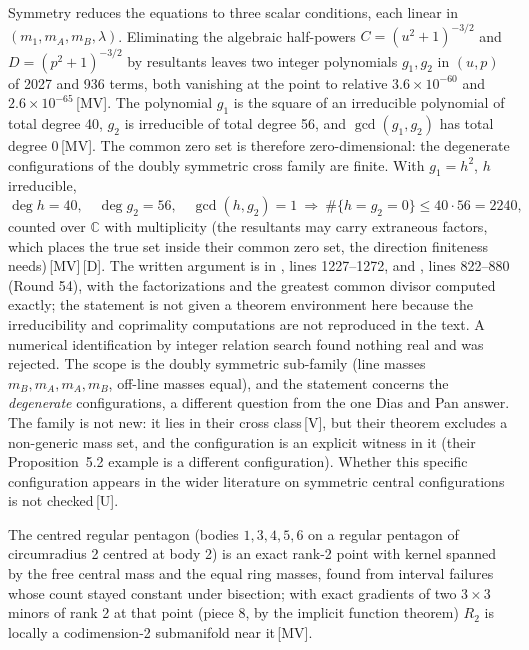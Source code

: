 \documentclass[11pt]{article}
\theoremstyle{definition}
\theoremstyle{remark}
\newcommand{\mk}[1]{\,{\scriptsize[#1]}}
\newcommand{\MV}{\mk{MV}}
\newcommand{\Dm}{\mk{D}}
\newcommand{\Vm}{\mk{V}}
\newcommand{\Um}{\mk{U}}
\begin{document}
Symmetry reduces the equations to three scalar conditions, each linear in $(m_1,m_A,m_B,\lambda)$. Eliminating the algebraic
half-powers $C=(u^2+1)^{-3/2}$ and $D=(p^2+1)^{-3/2}$ by resultants leaves two integer polynomials $g_1,g_2$ in $(u,p)$ of 2027 and
936 terms, both vanishing at the point to relative $3.6\times10^{-60}$ and $2.6\times10^{-65}$\MV. The polynomial $g_1$ is the
square of an irreducible polynomial of total degree 40, $g_2$ is irreducible of total degree 56, and $\gcd(g_1,g_2)$ has total
degree 0\MV. The common zero set is therefore zero-dimensional: the degenerate configurations of the doubly symmetric cross family
are finite. With $g_1=h^2$, $h$ irreducible,
\begin{equation}\label{eq:bezout}
\deg h=40,\quad\deg g_2=56,\quad\gcd(h,g_2)=1\ \Longrightarrow\ \#\{h=g_2=0\}\le40\cdot56=2240,
\end{equation}
counted over $\mathbb{C}$ with multiplicity (the resultants may carry extraneous factors, which
places the true set inside their common zero set, the direction finiteness needs)\MV\Dm. The written argument is in
, lines 1227--1272, %
and , lines 822--880 (Round 54), with
the factorizations and the greatest common divisor computed exactly; the statement is not given a theorem environment here because the
irreducibility and coprimality computations are not reproduced in the text.
A numerical identification by integer
relation search found nothing real and was rejected. The scope is the doubly symmetric sub-family (line masses $m_B,m_A,m_A,m_B$,
off-line masses equal), and the statement concerns the \emph{degenerate} configurations, a different question from the one
Dias and Pan answer. The family is not new: it lies in their cross class\Vm, but their theorem excludes a non-generic mass set,
and the configuration is an explicit witness in it (their Proposition~5.2 example is a different configuration).
Whether this specific configuration appears in the wider literature on symmetric central configurations is not checked\Um.

The centred regular pentagon (bodies $1,3,4,5,6$ on a regular pentagon of circumradius 2 centred at body 2) is an exact
rank-2 point with kernel spanned by the free central mass and the equal ring masses, found from interval failures whose
count stayed constant under bisection; with exact gradients of two $3\times3$ minors of rank 2 at that point (piece 8, by the
implicit function theorem) $R_2$ is locally a codimension-2 submanifold near it\MV.
\end{document}

